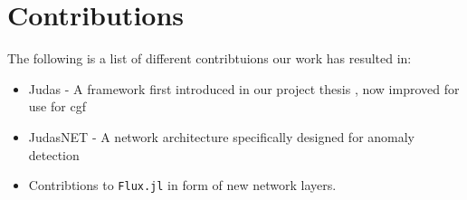 \section{Contributions}

The following is a list of different contribtuions our work has resulted in: 

\begin{itemize}
    \item Judas - A framework first introduced in our project thesis \cite{projthesis}, now improved for use for \acrfull{cgf}
    \item JudasNET - A network architecture specifically designed for anomaly detection 
    \item Contribtions to \texttt{Flux.jl} in form of new network layers.
\end{itemize}